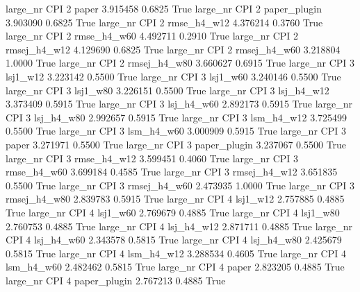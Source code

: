   large_nr      CPI                 2        paper    3.915458      0.6825    True
  large_nr      CPI                 2 paper_plugin    3.903090      0.6825    True
  large_nr      CPI                 2  rmse_h4_w12    4.376214      0.3760    True
  large_nr      CPI                 2  rmse_h4_w60    4.492711      0.2910    True
  large_nr      CPI                 2 rmsej_h4_w12    4.129690      0.6825    True
  large_nr      CPI                 2 rmsej_h4_w60    3.218804      1.0000    True
  large_nr      CPI                 2 rmsej_h4_w80    3.660627      0.6915    True
  large_nr      CPI                 3     lsj1_w12    3.223142      0.5500    True
  large_nr      CPI                 3     lsj1_w60    3.240146      0.5500    True
  large_nr      CPI                 3     lsj1_w80    3.226151      0.5500    True
  large_nr      CPI                 3   lsj_h4_w12    3.373409      0.5915    True
  large_nr      CPI                 3   lsj_h4_w60    2.892173      0.5915    True
  large_nr      CPI                 3   lsj_h4_w80    2.992657      0.5915    True
  large_nr      CPI                 3   lsm_h4_w12    3.725499      0.5500    True
  large_nr      CPI                 3   lsm_h4_w60    3.000909      0.5915    True
  large_nr      CPI                 3        paper    3.271971      0.5500    True
  large_nr      CPI                 3 paper_plugin    3.237067      0.5500    True
  large_nr      CPI                 3  rmse_h4_w12    3.599451      0.4060    True
  large_nr      CPI                 3  rmse_h4_w60    3.699184      0.4585    True
  large_nr      CPI                 3 rmsej_h4_w12    3.651835      0.5500    True
  large_nr      CPI                 3 rmsej_h4_w60    2.473935      1.0000    True
  large_nr      CPI                 3 rmsej_h4_w80    2.839783      0.5915    True
  large_nr      CPI                 4     lsj1_w12    2.757885      0.4885    True
  large_nr      CPI                 4     lsj1_w60    2.769679      0.4885    True
  large_nr      CPI                 4     lsj1_w80    2.760753      0.4885    True
  large_nr      CPI                 4   lsj_h4_w12    2.871711      0.4885    True
  large_nr      CPI                 4   lsj_h4_w60    2.343578      0.5815    True
  large_nr      CPI                 4   lsj_h4_w80    2.425679      0.5815    True
  large_nr      CPI                 4   lsm_h4_w12    3.288534      0.4605    True
  large_nr      CPI                 4   lsm_h4_w60    2.482462      0.5815    True
  large_nr      CPI                 4        paper    2.823205      0.4885    True
  large_nr      CPI                 4 paper_plugin    2.767213      0.4885    True
